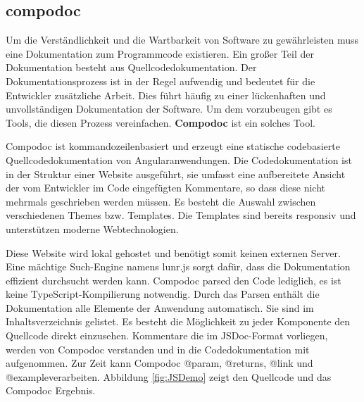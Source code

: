 \subsection{compodoc}
\label{compodoc}

Um die Verständlichkeit und die Wartbarkeit von Software zu gewährleisten muss eine Dokumentation zum Programmcode existieren. Ein großer Teil der Dokumentation besteht aus Quellcodedokumentation. Der Dokumentationsprozess ist in der Regel aufwendig und bedeutet für die Entwickler zusätzliche Arbeit. Dies führt häufig zu einer lückenhaften und unvollständigen Dokumentation der Software. Um dem vorzubeugen gibt es Tools, die diesen Prozess vereinfachen. 
\textbf{Compodoc} ist ein solches Tool.

Compodoc ist kommandozeilenbasiert und erzeugt eine statische codebasierte Quellcodedokumentation von Angularanwendungen. Die Codedokumentation ist in der Struktur einer Website ausgeführt, sie umfasst eine aufbereitete Ansicht der vom Entwickler im Code eingefügten Kommentare, so dass diese nicht mehrmals geschrieben werden müssen. 
Es besteht die Auswahl zwischen verschiedenen Themes bzw. Templates. Die Templates sind bereits responsiv und unterstützen moderne Webtechnologien.

Diese \glqq Website\grqq{}  wird lokal gehostet und benötigt somit keinen externen Server. Eine mächtige Such-Engine namens \glqq lunr.js\grqq{} sorgt dafür, dass die Dokumentation effizient durchsucht werden kann. Compodoc parsed den Code lediglich, es ist keine TypeScript-Kompilierung notwendig. Durch das Parsen enthält die Dokumentation alle Elemente der Anwendung automatisch. Sie sind im Inhaltsverzeichnis gelistet. Es besteht die Möglichkeit zu jeder Komponente den Quellcode direkt einzusehen. Kommentare die im JSDoc-Format \cite{JSdoc} vorliegen, werden von Compodoc \glqq verstanden\grqq{} und in die Codedokumentation mit aufgenommen. Zur Zeit kann Compodoc \glqq @param, @returns, @link und @example\grqq verarbeiten. Abbildung \ref{fig:JSDemo} zeigt den Quellcode und das Compodoc Ergebnis.

